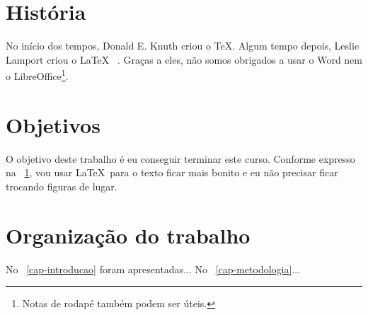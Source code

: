 \section{História}
\label{sec-historia}

No início dos tempos, Donald E. Knuth criou o \TeX. Algum tempo depois, Leslie Lamport criou o \LaTeX\ \cite{lamport94latex} . Graças a eles, não somos obrigados a usar o Word nem o LibreOffice\footnote{Notas de rodapé também podem ser úteis.}.


\section{Objetivos}
\label{sec-objetivos}

O objetivo deste trabalho é eu conseguir terminar este curso. Conforme expresso na \sectionautorefname~\ref{sec-historia}, vou usar \LaTeX\ para o texto ficar mais bonito e eu não precisar ficar trocando figuras de lugar.

\section{Organização do trabalho}
\label{sec-organizacao}

No \chapterautorefname~\ref{cap-introducao} foram apresentadas...
No \chapterautorefname~\ref{cap-metodologia}...

